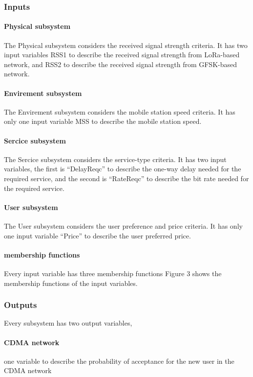 \subsubsection{Inputs}
\paragraph{Physical subsystem}
The Physical subsystem considers the received signal strength criteria.
It has two input variables RSS1 to describe the received signal strength from LoRa-based network,
 and RSS2 to describe the received signal strength from GFSK-based network.
\paragraph{Envirement subsystem}
The Envirement subsystem considers the mobile station speed criteria.
It has only one input variable MSS to describe the mobile station speed.
\paragraph{Sercice subsystem}
The Sercice subsystem considers the service-type criteria.
It has two input variables,
	the first is “DelayReqc” to describe the one-way delay needed for the required service,
	 and the second is “RateReqc” to describe the bit rate needed for the required service.
\paragraph{User subsystem}
The User subsystem considers the user preference and price criteria.
It has only one input variable “Price” to describe the user preferred price.
\paragraph*{membership functions}
Every input variable has three membership functions 
Figure 3 shows the membership functions of the input variables.

\subsubsection{Outputs}
Every subsystem has two output variables,
\paragraph{CDMA network}
one variable to describe the probability of acceptance for the new user in the CDMA network
